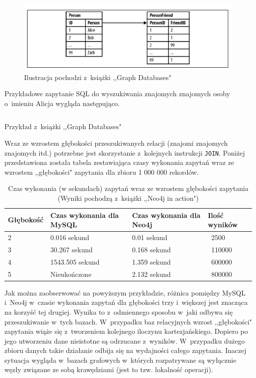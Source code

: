 \documentclass[brudnopis]{xmgr}
\begin{document}
\begin{figure}[H]
	\includegraphics[scale=0.75]{images/relational-schema-friends.png}
	\caption{Ilustracja pochodzi z~książki ,,Graph Databases"\cite{Robinson:2013:GD}}
\end{figure}

Przykładowe zapytanie SQL do wyszukiwania znajomych znajomych osoby o~imieniu Alicja wygląda następująco.

\begin{listing}[H]
	\inputminted{sql}{listings/sql/relational-schema-friends-fof-query.sql}
	\caption{Przykład z~książki ,,Graph Databases"\cite{Robinson:2013:GD}}
\end{listing}

Wraz ze wzrostem głębokości przeszukiwanych relacji (znajomi znajomych znajomych itd.) potrzebne jest skorzystanie z~kolejnych instrukcji \texttt{JOIN}. Poniżej przedstawiona została tabela zestawiająca czasy wykonania zapytań wraz ze wzrostem ,,głębokości" zapytania dla zbioru 1 000 000 rekordów.

\begin{table}[H]
    \begin{tabular}{|l|l|l|l|}
      \hline 
      \textbf{Głębokość} & \textbf{Czas wykonania dla MySQL} & \textbf{Czas wykonania dla Neo4j} & \textbf{Ilość wyników} \\
      \hline
      2 & 0.016 sekund & 0.01 sekund & {~}2500 \\
      3 & 30.267 sekund & 0.168 sekund & {~}110000 \\
      4 & 1543.505 sekund & 1.359 sekund & {~}600000 \\
      5 & Nieukończone & 2.132 sekund & {~}800000 \\
      \hline
   \end{tabular} 
    \caption{Czas wykonania (w sekundach) zapytań wraz ze wzrostem głębokości zapytania (Wyniki pochodzą z~książki ,,Neo4j in action"\cite{neo4jinaction})}
    \label{fig:mysqlvsneo4j_results}
\end{table}

Jak można zaobserwować na powyższym przykładzie, różnica pomiędzy MySQL i~Neo4j w~czasie wykonania zapytań dla głębokości trzy i~większej jest znacząca na korzyść tej drugiej. Wynika to z~odmiennego sposobu w~jaki odbywa się przeszukiwanie w~tych bazach. W~przypadku baz relacyjnych wzrost ,,głębokości" zapytania wiąże się z~tworzeniem kolejnego iloczynu kartezjańskiego. Dopiero po jego utworzeniu dane nieistotne są odrzucane z~wyników. W~przypadku dużego zbioru danych takie działanie odbija się na wydajności całego zapytania. Inaczej sytuacja wygląda w~bazach grafowych w~których rozpatrywane są wyłącznie węzły związane ze sobą krawędziami (jest to tzw. lokalność operacji).
\end{document}
